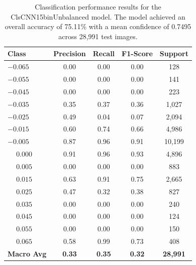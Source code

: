 \begin{table}[htbp]
\centering
\begin{tabular}{@{}lcccc@{}}
\toprule
\textbf{Class} & \textbf{Precision} & \textbf{Recall} & \textbf{F1-Score} & \textbf{Support} \\
\midrule
$-0.065$ & 0.00 & 0.00 & 0.00 & 128 \\
$-0.055$ & 0.00 & 0.00 & 0.00 & 141 \\
$-0.045$ & 0.00 & 0.00 & 0.00 & 223 \\
$-0.035$ & 0.35 & 0.37 & 0.36 & 1,027 \\
$-0.025$ & 0.49 & 0.04 & 0.07 & 2,094 \\
$-0.015$ & 0.60 & 0.74 & 0.66 & 4,986 \\
$-0.005$ & 0.87 & 0.96 & 0.91 & 10,199 \\
$\phantom{-}0.000$ & 0.91 & 0.96 & 0.93 & 4,896 \\
$\phantom{-}0.005$ & 0.00 & 0.00 & 0.00 & 883 \\
$\phantom{-}0.015$ & 0.63 & 0.91 & 0.75 & 2,665 \\
$\phantom{-}0.025$ & 0.47 & 0.32 & 0.38 & 827 \\
$\phantom{-}0.035$ & 0.00 & 0.00 & 0.00 & 240 \\
$\phantom{-}0.045$ & 0.00 & 0.00 & 0.00 & 124 \\
$\phantom{-}0.055$ & 0.00 & 0.00 & 0.00 & 150 \\
$\phantom{-}0.065$ & 0.58 & 0.99 & 0.73 & 408 \\
\midrule
\textbf{Macro Avg} & \textbf{0.33} & \textbf{0.35} & \textbf{0.32} & \textbf{28,991} \\
\bottomrule
\end{tabular}
\caption{Classification performance results for the ClsCNN15binUnbalanced model. The model achieved an overall accuracy of 75.11\% with a mean confidence of 0.7495 across 28,991 test images.}
\label{tab:clf_report_ClsCNN15binUnbalanced}
\end{table}

